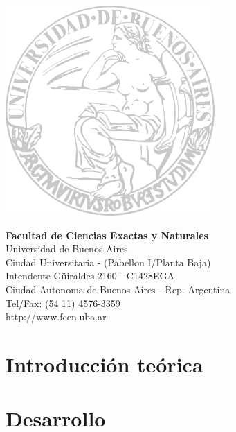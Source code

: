 \documentclass[10pt, a4paper, english, spanish]{article}
\begin{document}
\begin{multicols}{2}
\includegraphics[width=8cm]{caratula/logo-uba.png}

\columnbreak
\vspace*{4.5cm}
\raggedleft
\textbf{Facultad de Ciencias Exactas y Naturales}\\
Universidad de Buenos Aires\\
\small
Ciudad Universitaria - (Pabellon I/Planta Baja)\\
Intendente G\"uiraldes 2160 - C1428EGA\\
Ciudad Autonoma de Buenos Aires - Rep. Argentina\\
Tel/Fax: (54 11) 4576-3359\\
http://www.fcen.uba.ar
\end{multicols}

\restoregeometry

\clearpage


\tableofcontents

\vspace{3cm}

\clearpage

\setlength{\parindent}{10pt}

\section{Introducción teórica}

\clearpage

\section{Desarrollo}


\clearpage
\end{document}
